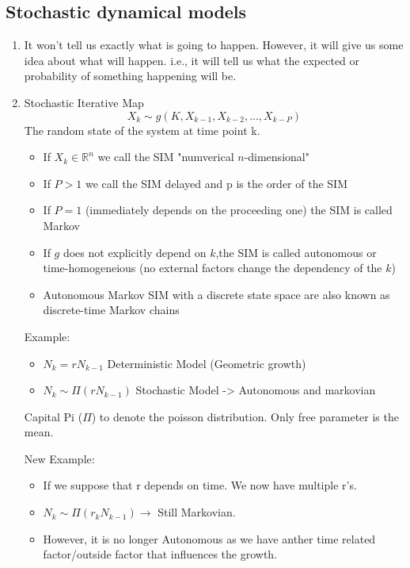 \documentclass[letter,12pt]{article}
\begin{document}
\subsection{Stochastic dynamical models}
\begin{enumerate}[1.]
  \item It won't tell us exactly what is going to happen. However, it will give us some idea about what will happen. i.e.,
    it will tell us what the expected or probability of something happening will be. 

  \item Stochastic Iterative Map
    \begin{equation}
      X_k \sim g(K, X_{k-1}, X_{k-2},...,X_{k-P})
    \end{equation}
    The random state of the system at time point k.
    \begin{itemize}
     \item If $X_k\in\mathbb{R}^n$ we call the SIM "numverical $n$-dimensional"
     \item If $P>1$ we call the SIM delayed and p is the order of the SIM
     \item If $P=1$ (immediately depends on the proceeding one) the SIM is called Markov
     \item If $g$ does not explicitly depend on $k$,the SIM is called autonomous or time-homogeneious (no external factors change the dependency of the $k$)
     \item Autonomous Markov SIM with a discrete state space are also known as discrete-time Markov chains
    \end{itemize}

    
    Example: 
    \begin{itemize}
      \item $N_k = rN_{k-1}$ Deterministic Model (Geometric growth)
      \item $N_k \sim \Pi(rN_{k-1})$ Stochastic Model -> Autonomous and markovian
    \end{itemize}

    Capital Pi ($\Pi$) to denote the poisson distribution. Only free parameter is the mean.

    New Example:
    \begin{itemize}
      \item If we suppose that r depends on time. We now have multiple r's. 
      \item $N_k \sim \Pi(r_kN_{k-1})\rightarrow$ Still Markovian. 
      \item However, it is no longer Autonomous as we have anther time related factor/outside factor that influences the growth.
    \end{itemize}


  
  
\end{enumerate}
\end{document}

